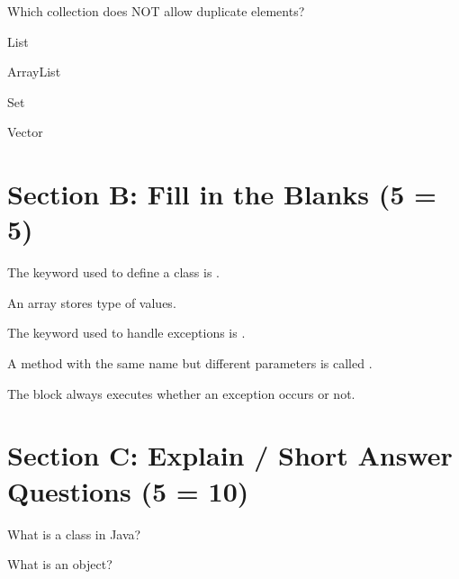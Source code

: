 \documentclass{CWNUExam}
\begin{document}
\begin{question}
Which collection does NOT allow duplicate elements?
\paren
\begin{choices}
\item List
\item ArrayList
\item Set
\item Vector
\end{choices}
\end{question}



\section{Section B: Fill in the Blanks (5  = 5)}

\begin{question}
The keyword used to define a class is \fillin.
\end{question}

\begin{question}
An array stores \fillin type of values.
\end{question}

\begin{question}
The keyword used to handle exceptions is \fillin.
\end{question}

\begin{question}
A method with the same name but different parameters is called \fillin.
\end{question}

\begin{question}
The \fillin block always executes whether an exception occurs or not.
\end{question}



\section{Section C: Explain / Short Answer Questions (5  = 10)}

\begin{problem}
What is a class in Java?
\end{problem}

\begin{problem}
What is an object?
\end{problem}
\end{document}
